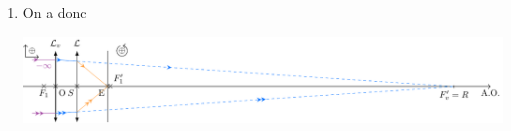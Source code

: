 \documentclass[../../main/main.tex]{subfiles}
\begin{document}
{\begin{enumerate}
\begin{enumerate}
\begin{tcbraster}[raster columns=2, raster equal height=rows]
\begin{tcb}
					            On va donc utiliser la formule de conjugaison d'une
					            lentille mince~:

					            \[ \frac{1}{\OFp} = \frac{1}{\OAp} - \frac{1}{\OA}\]
				            \end{tcb}
			            \end{tcbraster}
			            \begin{center}
				            \begin{tcb}(appl){Application}
					            Avec les données de l'exercice, on a

					            \[
						            \frac{1}{\obar{\rm SF'}} =
						            \frac{1}{\obar{\rm SE}} -
						            \frac{1}{\obar{\rm SR}}
					            \]
					            Soit
					            \begin{equation*}
						            \boxed{
							            \obar{\rm SR} =
							            \frac{
								            \obar{\rm SE}\obar{\rm SF'}}{
								            \obar{\rm SF'}-\obar{\rm SE}}
						            }
						            \quad \text{avec}\quad
						            \left\{
						            \begin{array}{rcl}
							            \obar{\rm SE}  & = & \SI{17}{mm}   \\
							            \obar{\rm SF'} & = & \SI{18.5}{mm}
						            \end{array}
						            \right.
					            \end{equation*}
					            Et
					            \[
						            \boxed{\obar{\rm SR} = \SI{21}{cm}}
					            \]
					            Avec la composition des distances et comme $\rm F'_v = R$,
					            on a finalement
					            \[
						            \boxed{
							            \obar{\rm OF'_v} =
							            \obar{\rm OS} + \obar{\rm SR} =
							            \num{1.2}+\num{20.9} = \SI{22}{cm}}
					            \]
					            Soit 
				            \end{tcb}
			            \end{center}
			      \item On a donc
			            \begin{center}
				            \hspace*{-2cm}
				            \includegraphics{oeil_hyper-fin}
			            \end{center}
		      \end{enumerate}
	\end{enumerate}
}
\end{document}

